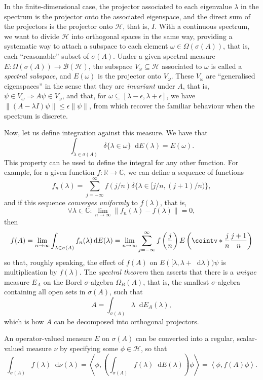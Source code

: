 \documentclass[10pt, a4paper]{article}
\numberwithin{equation}{section} %
\theoremstyle{definition}
\theoremstyle{plain}
\newcommand{\norm}[1]{\left\lVert#1\right\rVert}
\newcommand{\dif}{\mathop{}\!\mathrm{d}} %
\newcommand{\?}{\mathrel{?}} %
\newcommand{\R}{\mathbb{R}} %
\newcommand{\C}{\mathbb{C}} %
\newcommand{\angleb}[1]{\left\langle #1 \right\rangle} %
\newcommand{\Hs}{\mathcal{H}} %
\begin{document}
\begin{appendices}
      In the finite-dimensional case, the projector associated to each eigenvalue \(\lambda\) in the spectrum is the projector onto the associated eigenspace, and the direct sum of the projectors is the projector onto \(\Hs\), that is, \(I\). With a continuous spectrum, we want to divide \(\Hs\) into orthogonal spaces in the same way, providing a systematic way to attach a subspace to each element \(\omega \in \Omega(\sigma(A))\), that is, each ``reasonable'' subset of \(\sigma(A)\). Under a given spectral measure \(E : \Omega(\sigma(A)) \to \mathcal{B}(\Hs)\), the subspace \(V_{\omega} \subseteq \Hs\) associated to \(\omega\) is called a \emph{spectral subspace}, and \(E(\omega)\) is the projector onto \(V_{\omega}\). These \(V_{\omega}\) are ``generalised eigenspaces'' in the sense that they are \emph{invariant} under \(A\), that is, \(\psi \in V_{\omega} \Rightarrow A\psi \in V_{\omega}\), and that, for \(\omega \subseteq [\lambda - \epsilon, \lambda + \epsilon]\), we have \(\norm{(A - \lambda I)\psi} \leq \epsilon\norm{\psi}\), from which recover the familiar behaviour when the spectrum is discrete.

      Now, let us define integration against this measure. We have that
      \[ \int_{\lambda \in \sigma(A)} \delta\{\lambda \in \omega\} \dif{E(\lambda)} = E(\omega). \]
      This property can be used to define the integral for any other function. For example, for a given function \(f : \R \to \C\), we can define a sequence of functions
      \[ f_n(\lambda) = \sum_{j = -\infty}^{\infty} f(j/n) \delta\{\lambda \in [j/n, (j+1)/n)\}, \]
      and if this sequence \emph{converges uniformly} to \(f(\lambda)\), that is,
      \[ \forall \lambda \in \C : \lim_{n \to \infty} \norm{f_n(\lambda) - f(\lambda)} = 0, \]
      then
      \[ f(A) = \lim_{n\to\infty} \int_{\lambda \in \sigma(A)} f_n(\lambda) \dif{E(\lambda)} = \lim_{n\to\infty} \sum_{j = -\infty}^{\infty} f\left(\frac{j}{n}\right) E\left(\cointv*{\frac{j}{n}}{\frac{j+1}{n}}\right) \]
      so that, roughly speaking, the effect of \(f(A)\) on \(E([\lambda, \lambda+\dif{\lambda}))\psi\) is multiplication by \(f(\lambda)\). The \emph{spectral theorem} then asserts that there is a \emph{unique} measure \(E_A\) on the Borel \(\sigma\)-algebra \(\Omega_B(A)\), that is, the smallest \(\sigma\)-algebra containing all open sets in \(\sigma(A)\), such that
      \[ A = \int_{\sigma(A)} \lambda \dif{E_A(\lambda)}, \]
      which is how \(A\) can be decomposed into orthogonal projectors.

      An operator-valued measure \(E\) on \(\sigma(A)\) can be converted into a regular, scalar-valued measure \(\nu\) by specifying some \(\phi \in \Hs\), so that
      \[ \int_{\sigma(A)} f(\lambda) \dif{\nu(\lambda)} = \angleb{\phi, \left(\int_{\sigma(A)} f(\lambda) \dif{E(\lambda)}\right) \phi} = \angleb{\phi, f(A) \phi}. \]


\end{appendices}
\end{document}
